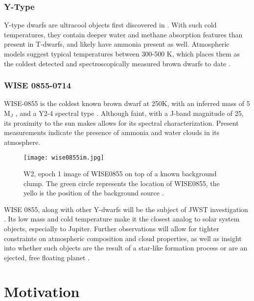 \subsubsection{Y-Type}
Y-type dwarfs are ultracool objects first discovered in \parencite{Cushing2011}. 
With such cold temperatures, they contain deeper water and methane absorption features than present in T-dwarfs, and likely have ammonia present as well.
Atmospheric models suggest typical temperatures between 300-500 K, which places them as the coldest detected and spectroscopically measured brown dwarfs to date \parencite{Cushing2011}.

\subsubsection{WISE 0855-0714}
WISE-0855 is the coldest known brown dwarf at 250K, with an inferred mass of 5 M$_{J}$ \parencite{Luhman2014}, and a Y2-4 spectral type \parencite{Leggett2015}.
Although faint, with a J-band magnitude of 25, its proximity to the sun makes allows for its spectral characterization.
Present measurements indicate the presence of ammonia \parencite{Leggett2015} and water clouds \parencite{Morley2014,Faherty2018} in its atmosphere.

\begin{wrapfigure}{r}{5.5cm}
	\centering
	\vspace{-1em}
	\texttt{[image: wise0855im.jpg]}
	\caption{W2, epoch 1 image of WISE0855 on top of a known background clump. The green circle represents the location of WISE0855, the yello is the position of the background source \parencite{Wright2014}. }
	\label{fig:wise0855im}
	\vspace{-6em}
\end{wrapfigure} 
WISE 0855, along with other Y-dwarfs will be the subject of JWST investigation \parencite{Oliveira2015,Oliveira2019}.
Its low mass and cold temperature make it the closest analog to solar system objects, especially to Jupiter. 
Further observations will allow for tighter constraints on atmospheric composition and cloud properties, as well as insight into whether such objects are the result of a star-like formation process or are an ejected, free floating planet \parencite{Beichman2014}.
\section{Motivation}
